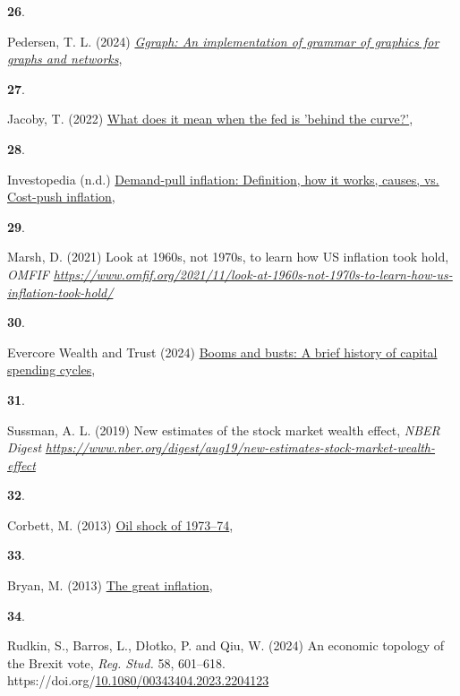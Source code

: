 \documentclass[
  10pt,
  letterpaper,
  DIV=11,
  numbers=noendperiod]{scrartcl}
\newlength{\cslhangindent}
\newlength{\csllabelwidth}
\newenvironment{CSLReferences}[2] %
 {\begin{list}{}{%
  \setlength{\itemindent}{0pt}
  \setlength{\leftmargin}{0pt}
  \setlength{\parsep}{0pt}
  \ifodd #1
   \setlength{\leftmargin}{\cslhangindent}
   \setlength{\itemindent}{-1\cslhangindent}
  \fi
  \setlength{\itemsep}{#2\baselineskip}}}
 {\end{list}}
\newcommand{\CSLLeftMargin}[1]{\parbox[t]{\csllabelwidth}{\strut#1\strut}}
\newcommand{\CSLRightInline}[1]{\parbox[t]{\linewidth - \csllabelwidth}{\strut#1\strut}}
\begin{document}
\begin{CSLReferences}{1}{0}
\CSLLeftMargin{\textbf{26}. }%
\CSLRightInline{Pedersen, T. L. (2024)
\emph{\href{https://CRAN.R-project.org/package=ggraph}{Ggraph: An
implementation of grammar of graphics for graphs and networks}}, }

\CSLLeftMargin{\textbf{27}. }%
\CSLRightInline{Jacoby, T. (2022)
\href{https://www.nasdaq.com/articles/what-does-it-mean-when-the-fed-is-behind-the-curve}{What
does it mean when the fed is 'behind the curve?'}, }

\CSLLeftMargin{\textbf{28}. }%
\CSLRightInline{Investopedia (n.d.)
\href{https://www.investopedia.com/terms/d/demandpullinflation.asp}{Demand-pull
inflation: Definition, how it works, causes, vs. Cost-push inflation}, }

\CSLLeftMargin{\textbf{29}. }%
\CSLRightInline{Marsh, D. (2021) Look at 1960s, not 1970s, to learn how
{US} inflation took hold, \emph{OMFIF}
\emph{\url{https://www.omfif.org/2021/11/look-at-1960s-not-1970s-to-learn-how-us-inflation-took-hold/}}}

\CSLLeftMargin{\textbf{30}. }%
\CSLRightInline{Evercore Wealth and Trust (2024)
\href{https://evercorewealthandtrust.com/booms-and-busts-a-brief-history-of-capital-spending-cycles/}{Booms
and busts: A brief history of capital spending cycles}, }

\CSLLeftMargin{\textbf{31}. }%
\CSLRightInline{Sussman, A. L. (2019) New estimates of the stock market
wealth effect, \emph{NBER Digest}
\emph{\url{https://www.nber.org/digest/aug19/new-estimates-stock-market-wealth-effect}}}

\CSLLeftMargin{\textbf{32}. }%
\CSLRightInline{Corbett, M. (2013)
\href{https://www.federalreservehistory.org/essays/oil-shock-of-1973-74}{Oil
shock of 1973--74}, }

\CSLLeftMargin{\textbf{33}. }%
\CSLRightInline{Bryan, M. (2013)
\href{https://www.federalreservehistory.org/essays/great-inflation}{The
great inflation}, }

\CSLLeftMargin{\textbf{34}. }%
\CSLRightInline{Rudkin, S., Barros, L., Dłotko, P. and Qiu, W. (2024) An
economic topology of the {B}rexit vote, \emph{Reg. Stud.} 58, 601--618.
https://doi.org/\href{https://doi.org/10.1080/00343404.2023.2204123}{10.1080/00343404.2023.2204123}}

\end{CSLReferences}
\end{document}
